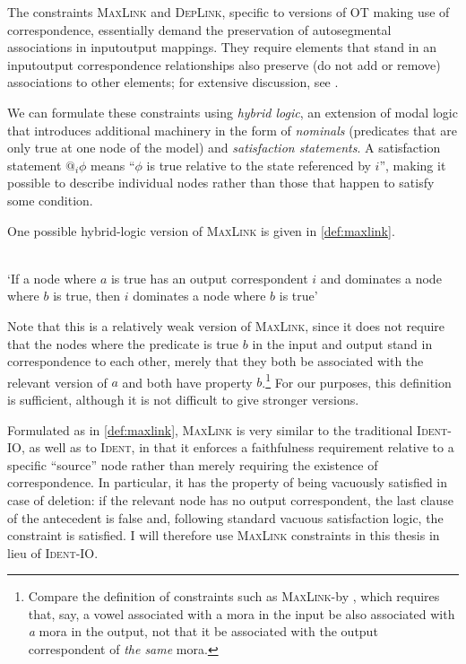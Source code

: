 The constraints \textsc{MaxLink} and \textsc{DepLink}, specific to versions of OT making use of correspondence, essentially demand the preservation of autosegmental associations in input\endash output mappings. They require elements that stand in an input\endash output correspondence relationships also preserve (\ie do not add or remove) associations to other elements; for extensive discussion, see \citet{moren01:_distin}.

We can formulate these constraints using \emph{hybrid logic}, an extension of modal logic that introduces additional machinery in the form of \emph{nominals} (predicates that are only true at one node of the model) and \emph{satisfaction statements}. A satisfaction statement $@_{i}\phi$ means \enquote{$\phi$ is true relative to the state referenced by $i$}, making it possible to describe individual nodes rather than those that happen to satisfy some condition.

One possible hybrid\hyp logic version of \textsc{MaxLink} is given in \cref{def:maxlink}.

\begin{constraint}
  \label{def:maxlink}
  \\
  `If a node where $a$ is true has an output correspondent $i$ and dominates a node where $b$ is true, then $i$ dominates a node where $b$ is true'
\end{constraint}

Note that this is a relatively weak version of \textsc{MaxLink}, since it does not require that the nodes where the predicate is true $b$ in the input and output stand in correspondence to each other, merely that they both be associated with the relevant version of $a$ and both have property $b$.\footnote{Compare the definition of constraints such as \textsc{MaxLink}-\mo[V] by \citet{moren01:_distin}, which requires that, say, a vowel associated with a mora in the input be also associated with \emph{a} mora in the output, not that it be associated with the output correspondent of \emph{the same} mora.} For our purposes, this definition is sufficient, although it is not difficult to give stronger versions.

Formulated as in \cref{def:maxlink}, \textsc{MaxLink} is very similar to the traditional \textsc{Ident-IO}, as well as to  \textsc{Ident}, in that it enforces a faithfulness requirement relative to a specific \enquote{source} node rather than merely requiring the existence of correspondence. In particular, it has the property of being vacuously satisfied in case of deletion: if the relevant node has no output correspondent, the last clause of the antecedent is false and, following standard vacuous satisfaction logic, the constraint is satisfied. I will therefore use \textsc{MaxLink} constraints in this thesis in lieu of \textsc{Ident-IO}.

